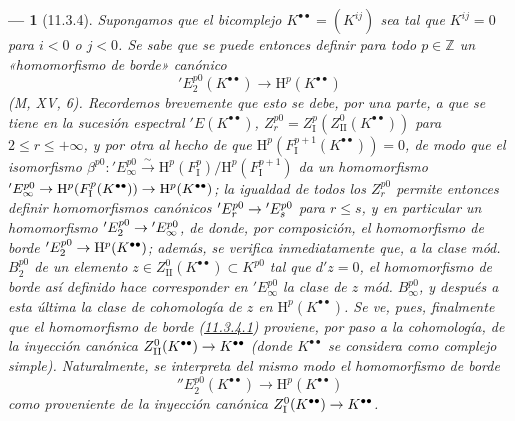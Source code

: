 \documentclass[10pt,oneside,openany]{book}
\theoremstyle{egaenv}\newtheorem*{env}{---}
\theoremstyle{egastatement}
\theoremstyle{egadescription}
\renewcommand{\leq}{\leqslant}
\renewcommand{\to}{\mathchoice{\longrightarrow}{\rightarrow}{\rightarrow}{\rightarrow}}
\begin{document}
\begin{env}[11.3.4]
\label{0.11.3.4-fr}
Supongamos que el bicomplejo $K^{\bullet\bullet}=(K^{ij})$ sea tal que $K^{ij}=0$ para $i<0$ o $j<0$. Se sabe que se puede entonces definir para todo $p\in\mathbb Z$ un «homomorfismo de borde» canónico
\[
\label{0.11.3.4.1-fr}
  'E_2^{p0}(K^{\bullet\bullet})\longrightarrow
  \mathrm H^p(K^{\bullet\bullet})
  \tag{11.3.4.1}
\]
(M, XV, 6). Recordemos brevemente que esto se debe, por una parte, a que se tiene en la sucesión espectral $'E(K^{\bullet\bullet})$, $Z_r^{p0}=Z_{\mathrm I}^p(Z_{\mathrm{II}}^0(K^{\bullet\bullet}))$ para $2\leq r\leq+\infty$, y por otra al hecho de que $\mathrm H^p(F_{\mathrm I}^{p+1}(K^{\bullet\bullet}))=0$, de modo que el isomorfismo $\beta^{p0}:'E_\infty^{p0}\xrightarrow{\sim}
\mathrm H^p(F_{\mathrm I}^p)/\mathrm H^p(F_{\mathrm I}^{p+1})$ da un homomorfismo $'E_\infty^{p0}\to\mathrm H^p(F_{\mathrm I}^p(K^{\bullet\bullet}))
\to\mathrm H^p(K^{\bullet\bullet})$; la igualdad de todos los $Z_r^{p0}$ permite entonces definir homomorfismos canónicos $'E_r^{p0}\to'E_s^{p0}$ para $r\leq s$, y en particular un homomorfismo $'E_2^{p0}\to'E_\infty^{p0}$, de donde, por composición, el homomorfismo de borde $'E_2^{p0}\to\mathrm H^p(K^{\bullet\bullet})$; además, se verifica inmediatamente que, a la clase mód. $B_2^{p0}$ de un elemento $z\in Z_{\mathrm{II}}^0(K^{\bullet\bullet})\subset K^{p0}$ tal que $d'z=0$, el homomorfismo de borde así definido hace corresponder en $'E_\infty^{p0}$ la clase de $z$ mód. $B_\infty^{p0}$, y después a esta última la clase de cohomología de $z$ en $\mathrm H^p(K^{\bullet\bullet})$. Se ve, pues, finalmente que el \emph{homomorfismo de borde} (\hyperref[0.11.3.4.1-fr]{11.3.4.1}) \emph{proviene, por paso a la cohomología, de la inyección canónica} $Z_{\mathrm{II}}^0(K^{\bullet\bullet})\to K^{\bullet\bullet}$ (donde $K^{\bullet\bullet}$ se considera como complejo simple). Naturalmente, se interpreta del mismo modo el homomorfismo de borde
\[
\label{0.11.3.4.2-fr}
  ''E_2^{p0}(K^{\bullet\bullet})\longrightarrow
  \mathrm H^p(K^{\bullet\bullet})
  \tag{11.3.4.2}
\]
como proveniente de la inyección canónica $Z_{\mathrm I}^0(K^{\bullet\bullet})\to K^{\bullet\bullet}$.
\end{env}
\end{document}
